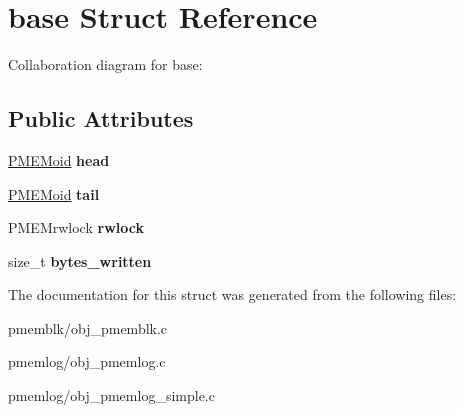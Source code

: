 \hypertarget{structbase}{}\section{base Struct Reference}
\label{structbase}


Collaboration diagram for base\+:
\subsection*{Public Attributes}
\begin{DoxyCompactItemize}
\item 
\mbox{\label{structbase_a204b27012357fc5a2389ce6af2af0bbf}} 
\hyperlink{structpmemoid}{P\+M\+E\+Moid} {\bfseries head}
\item 
\mbox{\label{structbase_ae3620a9af489aff396d1a0e95579c3b2}} 
\hyperlink{structpmemoid}{P\+M\+E\+Moid} {\bfseries tail}
\item 
\mbox{\label{structbase_a48d3f088327acf89a409f764f0c08d30}} 
P\+M\+E\+Mrwlock {\bfseries rwlock}
\item 
\mbox{\label{structbase_a1380b4faf8053707a83425210f03b8c8}} 
size\+\_\+t {\bfseries bytes\+\_\+written}
\end{DoxyCompactItemize}


The documentation for this struct was generated from the following files\+:\begin{DoxyCompactItemize}
\item 
pmemblk/obj\+\_\+pmemblk.\+c\item 
pmemlog/obj\+\_\+pmemlog.\+c\item 
pmemlog/obj\+\_\+pmemlog\+\_\+simple.\+c\end{DoxyCompactItemize}
